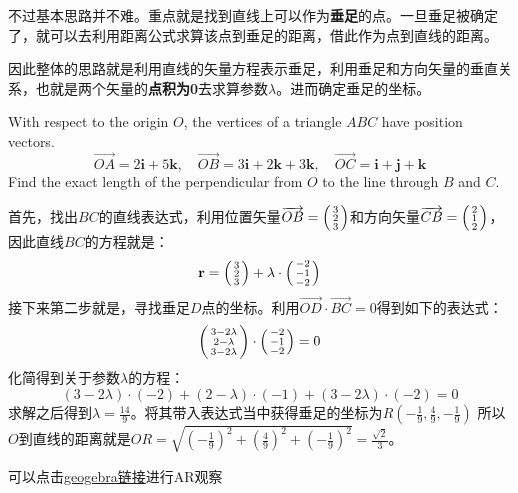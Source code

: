 不过基本思路并不难。重点就是找到直线上可以作为\textbf{垂足}的点。一旦垂足被确定了，就可以去利用距离公式求算该点到垂足的距离，借此作为点到直线的距离。

因此整体的思路就是利用直线的矢量方程表示垂足，利用垂足和方向矢量的垂直关系，也就是两个矢量的\textbf{点积为0}去求算参数$\lambda$。进而确定垂足的坐标。

\begin{ExampleBox}
With respect to the origin $O$, the vertices of a triangle $ABC$ have position vectors.
\[
	\overrightarrow{OA}= 2\mathbf{i}+5\mathbf{k}, \quad \overrightarrow{OB}= 3\mathbf{i}+2\mathbf{k}+3\mathbf{k}, \quad \overrightarrow{OC}= \mathbf{i}+\mathbf{j}+\mathbf{k} 
\]
Find the exact length of the perpendicular from $O$ to the line through $B$ and $C$.

\tcblower
首先，找出$BC$的直线表达式，利用位置矢量$\overrightarrow{OB}=\left(\begin{smallmatrix}3\\2\\3\end{smallmatrix}\right)$和方向矢量$\overrightarrow{CB}=\left(\begin{smallmatrix}2\\1\\2\end{smallmatrix}\right)$，因此直线$BC$的方程就是：
\[\mathbf{r}=\left(\begin{smallmatrix}3\\2\\3\end{smallmatrix}\right)+\lambda\cdot\left(\begin{smallmatrix}-2\\-1\\-2\end{smallmatrix}\right)\]
接下来第二步就是，寻找垂足$D$点的坐标。利用$\overrightarrow{OD}\cdot \overrightarrow{BC}=0$得到如下的表达式：
\[
	\left(\begin{smallmatrix}3-2\lambda\\2-\lambda\\3-2\lambda\end{smallmatrix}\right)\cdot\left(\begin{smallmatrix}-2\\-1\\-2\end{smallmatrix}\right)=0
\]
化简得到关于参数$\lambda$的方程：
\[
	(3-2\lambda)\cdot(-2)+(2-\lambda)\cdot(-1)+(3-2\lambda)\cdot(-2)=0
\]
求解之后得到$\lambda = \frac{14}{9}$。将其带入表达式当中获得垂足的坐标为$R(-\frac{1}{9},\frac{4}{9},-\frac{1}{9})$
所以$O$到直线的距离就是$OR=\sqrt{(-\frac{1}{9})^2+(\frac{4}{9})^2+(-\frac{1}{9})^2}=\frac{\sqrt2}{3}$。
\end{ExampleBox}
可以点击\href{https://www.geogebra.org/m/n7cqaqtd}{geogebra链接}进行AR观察





